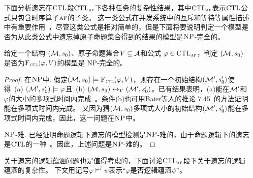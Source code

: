 下面分析遗忘在$\textrm{CTL}$段$\textrm{CTL}_{\textsc{a}\textsc{f}}$下各种任务的复杂性结果，其中$\textrm{CTL}_{\textsc{a}\textsc{f}}$表示$\textrm{CTL}$公式只包含时序算子$\textsc{a} \textsc{f}$的子类。
这一类公式在并发系统中的互斥和等待等属性描述中有重要作用~\cite{Baier:PMC:2008}，尽管这类公式是相对简单的，但是下面将要说明判定一个模型是否为从此类公式中遗忘掉原子命题集合得到的结果的模型是$\textsc{NP}$-完全的。
\begin{proposition}[模型检测]
	\label{modelChecking}
	给定一个结构 $({\cal M},s_0)$、原子命题集合$V\subseteq{\cal A}$和公式 $\varphi \in \textrm{CTL}_{\textsc{a}\textsc{f}}$，判定 $({\cal M},s_0)$ 是否为${\textsc{F}_{\textsc{ctl}}}(\varphi, V)$的模型是 \textsc{NP}-完全的。
\end{proposition}
\begin{proof}
	在$\textsc{NP}$中. 假定$({\cal M},s_0) \models {\textsc{F}_{\textsc{ctl}}}(\varphi,V)$，则存在一个初始结构$({\cal M}', s_0')$使得\ (a) $({\cal M}',s_0') \models \varphi$且\ (b) $({\cal M},s_0) \leftrightarrow_V ({\cal M}',s_0')$。已有结果表明，(a)能在${\cal M}'$和 $\varphi$的大小的多项式时间内完成~\cite{DBLP:books/daglib/0007403}。条件(b)也可用Baier等人的推论 7.45~\cite{Baier:PMC:2008}的方法证明能在多项式时间内完成。
	又因为猜$({\cal M},s_0)$多项式大小的初始结构$({\cal M}',s_0')$能在多项式时间内完成，因此，这一问题在$\textsc{NP}$中。
	
	$\textsc{NP}$-难. 已经证明命题逻辑下遗忘的模型检测是$\textsc{NP}$-难的，由于命题逻辑下的遗忘是$\textrm{CTL}$的一种~\cite{Zhang2008Properties}。因此，上述问题是$\textsc{NP}$-难的。
\end{proof}

关于遗忘的逻辑蕴涵问题也是值得考虑的，下面讨论$\textrm{CTL}_{\textsc{a}\textsc{f}}$段下关于遗忘的逻辑蕴涵的复杂性。
下文用记号$\varphi \models^? \psi$表示“$\varphi$是否逻辑蕴涵$\psi$”。

